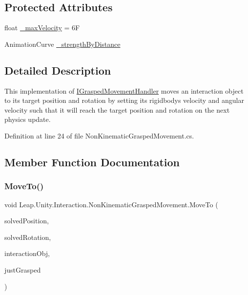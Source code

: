 \subsection*{Protected Attributes}
\begin{DoxyCompactItemize}
\item 
float \mbox{\hyperlink{class_leap_1_1_unity_1_1_interaction_1_1_non_kinematic_grasped_movement_a7f5c311f0900813b68eda7b459683cb0}{\+\_\+max\+Velocity}} = 6F
\item 
Animation\+Curve \mbox{\hyperlink{class_leap_1_1_unity_1_1_interaction_1_1_non_kinematic_grasped_movement_af5bfd871019106e6640b6d2cd050d72a}{\+\_\+strength\+By\+Distance}}
\end{DoxyCompactItemize}


\subsection{Detailed Description}
This implementation of \mbox{\hyperlink{interface_leap_1_1_unity_1_1_interaction_1_1_i_grasped_movement_handler}{I\+Grasped\+Movement\+Handler}} moves an interaction object to its target position and rotation by setting its rigidbody\textquotesingle{}s velocity and angular velocity such that it will reach the target position and rotation on the next physics update. 



Definition at line 24 of file Non\+Kinematic\+Grasped\+Movement.\+cs.



\subsection{Member Function Documentation}
\mbox{\label{class_leap_1_1_unity_1_1_interaction_1_1_non_kinematic_grasped_movement_a08d130dc9eb2ddc98347725867b2f6de}} 
\subsubsection{\texorpdfstring{MoveTo()}{MoveTo()}}
{\footnotesize\ttfamily void Leap.\+Unity.\+Interaction.\+Non\+Kinematic\+Grasped\+Movement.\+Move\+To (\begin{DoxyParamCaption}\item[{Vector3}]{solved\+Position,  }\item[{Quaternion}]{solved\+Rotation,  }\item[{\mbox{\hyperlink{class_leap_1_1_unity_1_1_interaction_1_1_interaction_behaviour}{Interaction\+Behaviour}}}]{interaction\+Obj,  }\item[{bool}]{just\+Grasped }\end{DoxyParamCaption})}



